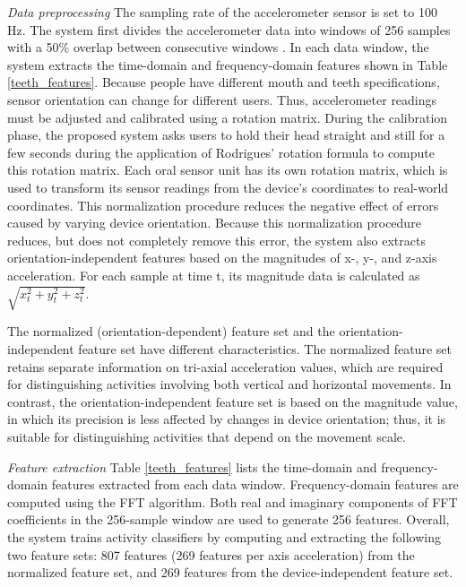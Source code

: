 \textit{Data preprocessing}
\newline
The sampling rate of the accelerometer sensor is set to 100 Hz. The system first divides the accelerometer data into windows of 256 samples with a 50\% overlap between consecutive windows \cite{KristofVanLaerhoven:2000}. In each data window, the system extracts the time-domain and frequency-domain features shown in Table \ref{teeth_features}. 
Because people have different mouth and teeth specifications, sensor orientation can change for different users. Thus, accelerometer readings must be adjusted and calibrated using a rotation matrix. During the calibration phase, the proposed system asks users to hold their head straight and still for a few seconds during the application of Rodrigues' rotation formula to compute this rotation matrix. Each oral sensor unit has its own rotation matrix, which is used to transform its sensor readings from the device's coordinates to real-world coordinates. This normalization procedure reduces the negative effect of errors caused by varying device orientation. Because this normalization procedure reduces, but does not completely remove this error, the system also extracts orientation-independent features based on the magnitudes of x-, y-, and z-axis acceleration. For each sample at time t, its magnitude data is calculated as $\sqrt{x_{t}^{2}+y_{t}^{2}+z_{t}^{2}}$.


The normalized (orientation-dependent) feature set and the orientation-independent feature set have different characteristics. The normalized feature set retains separate information on tri-axial acceleration values, which are required for distinguishing activities involving both vertical and horizontal movements. In contrast, the orientation-independent feature set is based on the magnitude value, in which its precision is less affected by changes in device orientation; thus, it is suitable for distinguishing activities that depend on the movement scale.

\textit{Feature extraction}
\newline
Table \ref{teeth_features} lists the time-domain and frequency-domain features extracted from each data window. Frequency-domain features are computed using the FFT algorithm. Both real and imaginary components of FFT coefficients in the 256-sample window are used to generate 256 features. Overall, the system trains activity classifiers by computing and extracting the following two feature sets: 807 features (269 features per axis acceleration) from the normalized feature set, and 269 features from the device-independent feature set.


